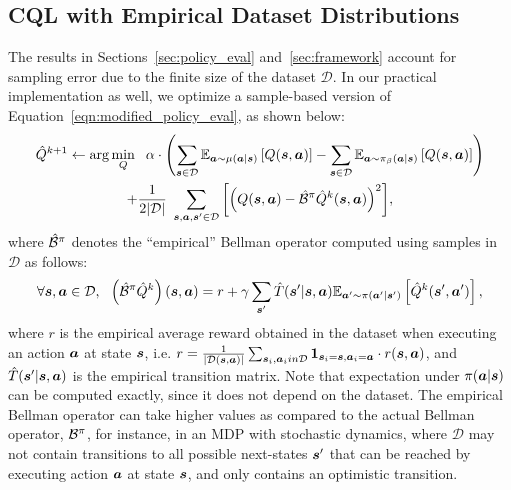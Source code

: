 \subsection{CQL with Empirical Dataset Distributions}
\label{app:handling_unobserved_actions}

The results in Sections~\ref{sec:policy_eval} and~\ref{sec:framework} account for sampling error due to the finite size of the dataset $\mathcal{D}$. In our practical implementation as well, we optimize a sample-based version of Equation~\ref{eqn:modified_policy_eval}, as shown below:
\begin{multline}
    \small{\hat{Q}^{k+1} \leftarrow \arg\min_{Q}~~ \alpha \cdot \left(\sum_{\boldsymbol{s}\in \mathcal{D}} \mathbb{E}_{\boldsymbol{a}\sim \mu(\boldsymbol{a}|\boldsymbol{s})}\left[Q(\boldsymbol{s}, \boldsymbol{a})\right] - {\sum_{\boldsymbol{s}\in \mathcal{D}} \mathbb{E}_{\boldsymbol{a}\sim {\pi_\beta}(\boldsymbol{a}|\boldsymbol{s})}\left[Q(\boldsymbol{s}, \boldsymbol{a})\right]} \right)} \\
    \small{+ \frac{1}{2 |\mathcal{D}|}~ \sum_{\boldsymbol{s}, \boldsymbol{a}, \boldsymbol{s}' \in \mathcal{D}}\left[\left(Q(\boldsymbol{s}, \boldsymbol{a}) - \hat{\mathcal{B}}^\pi\hat{Q}^{k} (\boldsymbol{s}, \boldsymbol{a}) \right)^2 \right]},
    \label{eqn:sampled_policy_eval}
\end{multline}
where $\hat{\mathcal{B}}^\pi$ denotes the ``empirical'' Bellman operator computed using samples in $\mathcal{D}$ as follows:
\begin{equation}
\label{eqn:app_empirical_bellman}
    \forall \boldsymbol{s}, \boldsymbol{a} \in \mathcal{D}, ~~ \left(\hat{\mathcal{B}}^\pi \hat{Q}^k \right)(\boldsymbol{s}, \boldsymbol{a}) = r + \gamma \sum_{\boldsymbol{s}'} \hat{T}(\boldsymbol{s}'|\boldsymbol{s}, \boldsymbol{a}) \mathbb{E}_{\boldsymbol{a}' \sim \pi(\boldsymbol{a}'|\boldsymbol{s}')}\left[\hat{Q}^k(\boldsymbol{s}' , \boldsymbol{a}')\right],  
\end{equation}
where $r$ is the empirical average reward obtained in the dataset when executing an action $\boldsymbol{a}$ at state $\boldsymbol{s}$, i.e. \mbox{$r = \frac{1}{|\mathcal{D}(\boldsymbol{s}, \boldsymbol{a})|} \sum_{\boldsymbol{s}_i, \boldsymbol{a}_i in \mathcal{D}} \boldsymbol{1}_{\boldsymbol{s}_i = \boldsymbol{s}, \boldsymbol{a}_i = \boldsymbol{a}} \cdot r(\boldsymbol{s}, \boldsymbol{a})$}, and $\hat{T}(\boldsymbol{s}'|\boldsymbol{s}, \boldsymbol{a})$ is the empirical transition matrix.
Note that expectation under $\pi(\boldsymbol{a}|\boldsymbol{s})$ can be computed exactly, since it does not depend on the dataset. The empirical Bellman operator can take higher values as compared to the actual Bellman operator, $\mathcal{B}^\pi$, for instance, in an MDP with stochastic dynamics, where $\mathcal{D}$ may not contain transitions to all possible next-states $\boldsymbol{s}'$ that can be reached by executing action $\boldsymbol{a}$ at state $\boldsymbol{s}$, and only contains an optimistic transition. 

